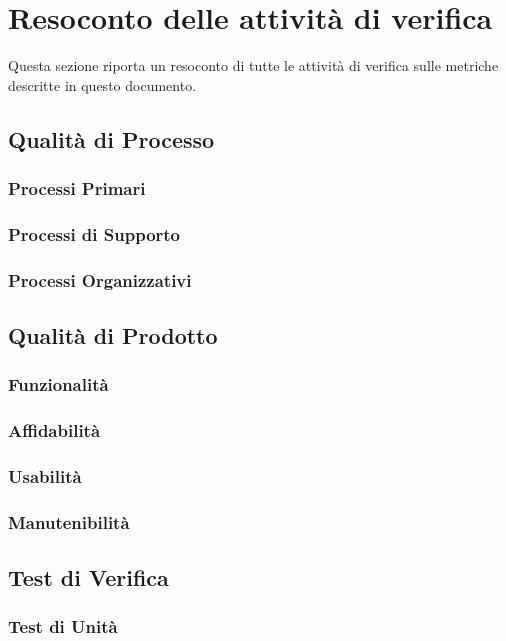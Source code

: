 \section{Resoconto delle attività di verifica}
	Questa sezione riporta un resoconto di tutte le attività di verifica sulle metriche descritte in questo documento.

	\subsection{Qualità di Processo}
		\subsubsection{Processi Primari}
		\subsubsection{Processi di Supporto}
				
		\subsubsection{Processi Organizzativi}
			
	
	\subsection{Qualità di Prodotto}
		\subsubsection{Funzionalità}
		\subsubsection{Affidabilità}
		\subsubsection{Usabilità}
		\subsubsection{Manutenibilità}		
	
	
	\subsection{Test di Verifica}
		\subsubsection{Test di Unità}
